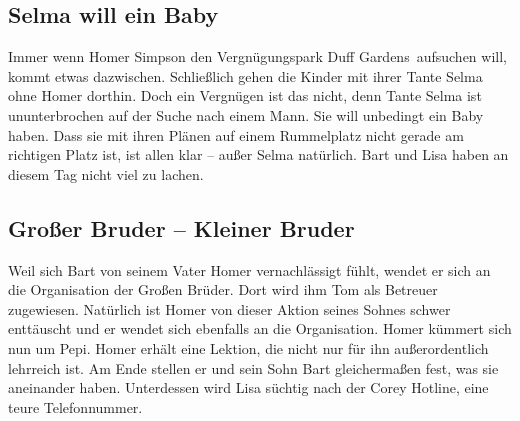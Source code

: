 	
\subsection{Selma will ein Baby}\label{9F11}
Immer wenn Homer Simpson den Vergnügungspark \glqq Duff Gardens\grqq\ aufsuchen will, kommt etwas dazwischen. Schließlich gehen die Kinder mit ihrer Tante Selma ohne Homer dorthin. Doch ein Vergnügen ist das nicht, denn Tante Selma ist ununterbrochen auf der Suche nach einem Mann. Sie will unbedingt ein Baby haben. Dass sie mit ihren Plänen auf einem Rummelplatz nicht gerade am richtigen Platz ist, ist allen klar -- außer Selma natürlich. Bart und Lisa haben an diesem Tag nicht viel zu lachen.


	
\subsection{Großer Bruder -- Kleiner Bruder}\label{9F12}
Weil sich Bart von seinem Vater Homer vernachlässigt fühlt, wendet er sich an die Organisation der \glqq Großen Brüder\grqq . Dort wird ihm Tom als Betreuer zugewiesen. Natürlich ist Homer von dieser Aktion seines Sohnes schwer enttäuscht und er wendet sich ebenfalls an die Organisation. Homer kümmert sich nun um Pepi. Homer erhält eine Lektion, die nicht nur für ihn außerordentlich lehrreich ist. Am Ende stellen er und sein Sohn Bart gleichermaßen fest, was sie aneinander haben. Unterdessen wird Lisa süchtig nach der Corey Hotline, eine teure Telefonnummer.

